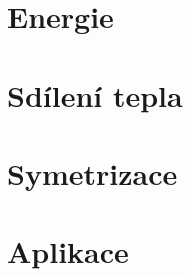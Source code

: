 \documentclass{article}
\begin{document}
\newpage





\section{Energie}




\section{Sdílení tepla}



\section{Symetrizace}



\section{Aplikace}
\end{document}
